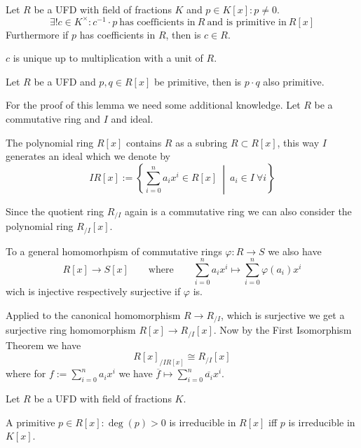 \begin{lemma}\label{lem:make_poly_prim}
   Let \(R\) be a UFD with field of fractions \(K\) and \(p \in K[x]: p \neq 0\).
   \[\exists!c \in K^\times: c^{-1} \cdot p~\text{has coefficients in}~R~\text{and is primitive in}~R[x]\]
   Furthermore if \(p\) has coefficients in \(R\), then is \(c \in R\).
\end{lemma}
\begin{remark}
   \(c\) is unique up to multiplication with a unit of \(R\).
\end{remark}

\begin{lemma}
   Let \(R\) be a UFD and \(p, q \in R[x]\) be primitive, then is \(p \cdot q\) also primitive.
\end{lemma}

For the proof of this lemma we need some additional knowledge.
Let \(R\) be a commutative ring and \(I\) and ideal.

The polynomial ring \(R[x]\) contains \(R\) as a subring \(R \subset R[x]\), this way \(I\) generates an ideal which we denote by
\[IR[x] := \left\{\sum_{i=0}^n a_i x^i \in R[x] ~\middle|~ a_i \in I~\forall i\right\}\]

Since the quotient ring \(R_{/I}\) again is a commutative ring we can also consider the polynomial ring \(R_{/I}[x]\).

To a general homomorhpism of commutative rings \(\varphi: R \to S\) we also have
\[R[x] \to S[x] \qquad\text{where}\qquad \sum_{i=0}^n a_i x^i \mapsto \sum_{i=0}^n \varphi(a_i) x^i\]
wich is injective respectively surjective if \(\varphi\) is.

Applied to the canonical homomorphism \(R \to R_{/I}\), which is surjective we get a surjective ring homomorphism \(R[x] \to R_{/I}[x]\).
Now by the First Isomorphism Theorem we have
\[R[x]_{/IR[x]} \cong R_{/I}[x]\]
where for \(f := \sum_{i=0}^n a_i x^i\) we have \(\overline{f} \mapsto \sum_{i=0}^n \overline{a_i}x^i\).

\begin{proposition}
   Let \(R\) be a UFD with field of fractions \(K\).

   A primitive \(p \in R[x]: \deg(p) > 0\) is irreducible in \(R[x]\) iff \(p\) is irreducible in \(K[x]\).
\end{proposition}

